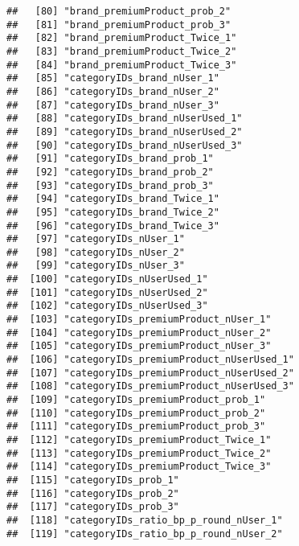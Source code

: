 \documentclass[10pt]{report}
\begin{document}
\begin{verbatim}
##   [80] "brand_premiumProduct_prob_2"                          
##   [81] "brand_premiumProduct_prob_3"                          
##   [82] "brand_premiumProduct_Twice_1"                         
##   [83] "brand_premiumProduct_Twice_2"                         
##   [84] "brand_premiumProduct_Twice_3"                         
##   [85] "categoryIDs_brand_nUser_1"                            
##   [86] "categoryIDs_brand_nUser_2"                            
##   [87] "categoryIDs_brand_nUser_3"                            
##   [88] "categoryIDs_brand_nUserUsed_1"                        
##   [89] "categoryIDs_brand_nUserUsed_2"                        
##   [90] "categoryIDs_brand_nUserUsed_3"                        
##   [91] "categoryIDs_brand_prob_1"                             
##   [92] "categoryIDs_brand_prob_2"                             
##   [93] "categoryIDs_brand_prob_3"                             
##   [94] "categoryIDs_brand_Twice_1"                            
##   [95] "categoryIDs_brand_Twice_2"                            
##   [96] "categoryIDs_brand_Twice_3"                            
##   [97] "categoryIDs_nUser_1"                                  
##   [98] "categoryIDs_nUser_2"                                  
##   [99] "categoryIDs_nUser_3"                                  
##  [100] "categoryIDs_nUserUsed_1"                              
##  [101] "categoryIDs_nUserUsed_2"                              
##  [102] "categoryIDs_nUserUsed_3"                              
##  [103] "categoryIDs_premiumProduct_nUser_1"                   
##  [104] "categoryIDs_premiumProduct_nUser_2"                   
##  [105] "categoryIDs_premiumProduct_nUser_3"                   
##  [106] "categoryIDs_premiumProduct_nUserUsed_1"               
##  [107] "categoryIDs_premiumProduct_nUserUsed_2"               
##  [108] "categoryIDs_premiumProduct_nUserUsed_3"               
##  [109] "categoryIDs_premiumProduct_prob_1"                    
##  [110] "categoryIDs_premiumProduct_prob_2"                    
##  [111] "categoryIDs_premiumProduct_prob_3"                    
##  [112] "categoryIDs_premiumProduct_Twice_1"                   
##  [113] "categoryIDs_premiumProduct_Twice_2"                   
##  [114] "categoryIDs_premiumProduct_Twice_3"                   
##  [115] "categoryIDs_prob_1"                                   
##  [116] "categoryIDs_prob_2"                                   
##  [117] "categoryIDs_prob_3"                                   
##  [118] "categoryIDs_ratio_bp_p_round_nUser_1"                 
##  [119] "categoryIDs_ratio_bp_p_round_nUser_2"                 

\end{verbatim}
\end{document}
